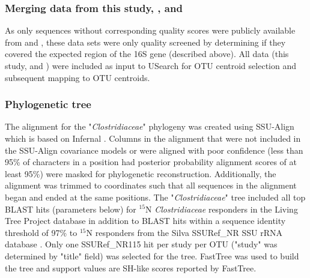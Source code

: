 
\subsubsection{Merging data from this study, \citet{Garcia_Pichel_2013}, and
\citet{Steven_2013}} As only sequences without corresponding quality scores
were publicly available from \citet{Garcia_Pichel_2013} and
\citet{Steven_2013}, these data sets were only quality screened by determining
if they covered the expected region of the 16S gene (described above). All data
(this study, \citet{Garcia_Pichel_2013} and \citet{Steven_2013}) were included
as input to USearch for OTU centroid selection and subsequent mapping to OTU
centroids. 

\subsubsection{Phylogenetic tree}
The alignment for the "\textit{Clostridiaceae}" phylogeny was created using
SSU-Align which is based on Infernal \citep{24008419, 19307242}. Columns in the
alignment that were not included in the SSU-Align covariance models or were
aligned with poor confidence (less than 95\% of characters in a position had
posterior probability alignment scores of at least 95\%) were masked for
phylogenetic reconstruction. Additionally, the alignment was trimmed to
coordinates such that all sequences in the alignment began and ended at the
same positions. The "\textit{Clostridiaceae}" tree included all top BLAST hits
(parameters below) for $^{15}$N \textit{Clostridiaceae} responders in the
Living Tree Project database \citep{Yarza_2008} in addition to BLAST hits
within a sequence identity
threshold of 97\% to $^{15}$N responders from the Silva SSURef\_NR SSU rRNA
database \citep{17947321}. Only one SSURef\_NR115 hit per study per OTU
("study" was determined by "title" field) was selected for the tree. FastTree
\citep{20224823} was used to build the tree and support values are
SH-like scores reported by FastTree.

